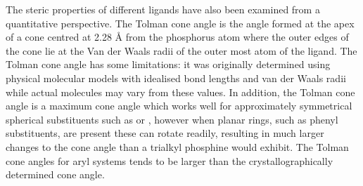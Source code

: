 
The steric properties of different ligands have also been examined from a quantitative perspective.  The Tolman cone angle is the angle formed at the apex of a cone centred at 2.28 \si{\angstrom} from the phosphorus atom where the outer edges of the cone lie at the Van der Waals radii of the outer most atom of the ligand.  The Tolman cone angle has some limitations: it was originally determined using physical molecular models with idealised bond lengths and van der Waals radii while actual molecules may vary from these values.  In addition, the Tolman cone angle is a maximum cone angle which works well for approximately symmetrical spherical substituents such as  or , however when planar rings, such as phenyl substituents, are present these can rotate readily, resulting in much larger changes to the cone angle than a trialkyl phosphine would exhibit.  The Tolman cone angles for aryl systems tends to be larger than the crystallographically determined cone angle.

